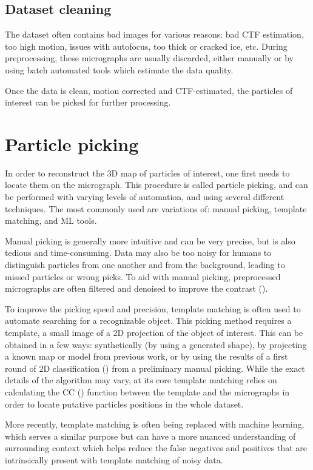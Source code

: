 \subsection{Dataset cleaning}
The dataset often contains bad images for various reasons: bad CTF estimation, too high motion, issues with autofocus, too thick or cracked ice, etc.
During preprocessing, these micrographs are usually discarded, either manually or by using batch automated tools which estimate the data quality.

Once the data is clean, motion corrected and CTF-estimated, the particles of interest can be picked for further processing.

\section{Particle picking}\label{em_particle_picking}
In order to reconstruct the 3D map of particles of interest, one first needs to locate them on the micrograph.
This procedure is called particle picking, and can be performed with varying levels of automation, and using several different techniques.
The most commonly used are variations of: manual picking, template matching, and ML tools.

Manual picking is generally more intuitive and can be very precise, but is also tedious and time-consuming.
Data may also be too noisy for humans to distinguish particles from one another and from the background, leading to missed particles or wrong picks.
To aid with manual picking, preprocessed micrographs are often filtered and denoised to improve the contrast ().

To improve the picking speed and precision, template matching is often used to automate searching for a recognizable object.
This picking method requires a template, a small image of a 2D projection of the object of interest.
This can be obtained in a few ways: synthetically (by using a generated shape), by projecting a known map or model from previous work, or by using the results of a first round of 2D classification () from a preliminary manual picking.
While the exact details of the algorithm may vary, at its core template matching relies on calculating the CC () function between the template and the micrographs in order to locate putative particles positions in the whole dataset.

More recently, template matching is often being replaced with machine learning, which serves a similar purpose but can have a more nuanced understanding of surrounding context which helps reduce the false negatives and positives that are intrinsically present with template matching of noisy data.

